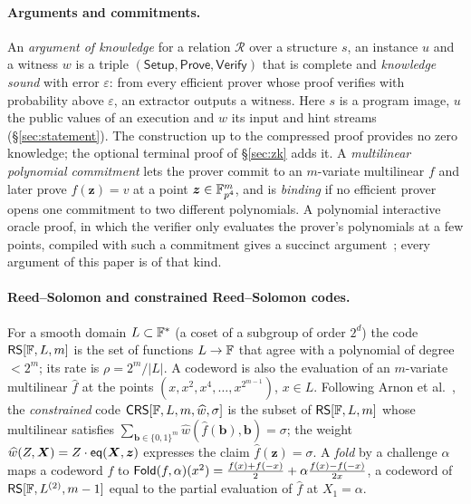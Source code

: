 \paragraph{Arguments and commitments.} An \emph{argument of knowledge} for a relation $\mathcal R$ over a structure $s$, an instance $u$ and a witness $w$ is a triple $(\mathsf{Setup}, \mathsf{Prove}, \mathsf{Verify})$ that is complete and \emph{knowledge sound} with error $\varepsilon$: from every efficient prover whose proof verifies with probability above $\varepsilon$, an extractor outputs a witness. Here $s$ is a program image, $u$ the public values of an execution and $w$ its input and hint streams (\S\ref{sec:statement}). The construction up to the compressed proof provides no zero knowledge; the optional terminal proof of \S\ref{sec:zk} adds it. A \emph{multilinear polynomial commitment} lets the prover commit to an $m$-variate multilinear $f$ and later prove $f(\bm z) = v$ at a point $\bm z \in \mathbb{F}_{p^4}^{m}$, and is \emph{binding} if no efficient prover opens one commitment to two different polynomials. A polynomial interactive oracle proof, in which the verifier only evaluates the prover's polynomials at a few points, compiled with such a commitment gives a succinct argument~\citep{bcs16}; every argument of this paper is of that kind.

\paragraph{Reed--Solomon and constrained Reed--Solomon codes.} For a smooth domain $L \subset \mathbb{F}^{*}$ (a coset of a subgroup of order $2^{d}$) the code $\mathsf{RS}[\mathbb{F}, L, m]$ is the set of functions $L \to \mathbb{F}$ that agree with a polynomial of degree $< 2^m$; its rate is $\rho = 2^m/|L|$. A codeword is also the evaluation of an $m$-variate multilinear $\widehat f$ at the points $(x, x^2, x^4, \dots, x^{2^{m-1}})$, $x \in L$. Following Arnon et al.~\citep{whir}, the \emph{constrained} code $\mathsf{CRS}[\mathbb{F}, L, m, \widehat w, \sigma]$ is the subset of $\mathsf{RS}[\mathbb{F}, L, m]$ whose multilinear satisfies $\sum_{\bm b \in \{0,1\}^m} \widehat w(\widehat f(\bm b), \bm b) = \sigma$; the weight $\widehat w(Z, \bm X) = Z \cdot \mathsf{eq}(\bm X, \bm z)$ expresses the claim $\widehat f(\bm z) = \sigma$. A \emph{fold} by a challenge $\alpha$ maps a codeword $f$ to $\mathsf{Fold}(f, \alpha)(x^2) = \tfrac{f(x) + f(-x)}{2} + \alpha \tfrac{f(x) - f(-x)}{2x}$, a codeword of $\mathsf{RS}[\mathbb{F}, L^{(2)}, m-1]$ equal to the partial evaluation of $\widehat f$ at $X_1 = \alpha$.

